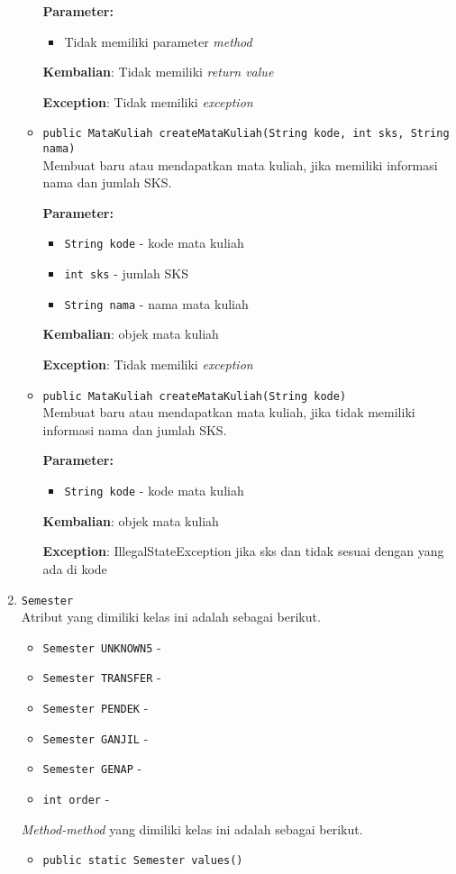 \documentclass{article}
\begin{document}
\begin{enumerate}
\begin{itemize}
\textbf{Parameter:}\begin{itemize}
\item Tidak memiliki parameter \textit{method}
\end{itemize}
\textbf{Kembalian}: Tidak memiliki \textit{return value}

\textbf{Exception}: Tidak memiliki \textit{exception}

\item \texttt{public MataKuliah createMataKuliah(String kode, int sks, String nama)}\\ 
Membuat baru atau mendapatkan mata kuliah, jika memiliki informasi
 nama dan jumlah SKS.

\textbf{Parameter:}
\begin{itemize}
\item \texttt{String kode} - 
kode mata kuliah
\item \texttt{int sks} - 
jumlah SKS
\item \texttt{String nama} - 
nama mata kuliah
\end{itemize}
\textbf{Kembalian}: objek mata kuliah

\textbf{Exception}: Tidak memiliki \textit{exception}

\item \texttt{public MataKuliah createMataKuliah(String kode)}\\ 
Membuat baru atau mendapatkan mata kuliah, jika tidak memiliki informasi
 nama dan jumlah SKS.

\textbf{Parameter:}
\begin{itemize}
\item \texttt{String kode} - 
kode mata kuliah
\end{itemize}
\textbf{Kembalian}: objek mata kuliah

\textbf{Exception}: IllegalStateException
             jika sks dan tidak sesuai dengan yang ada di kode

\end{itemize}
\item \texttt{Semester}\\ 
Atribut yang dimiliki kelas ini adalah sebagai berikut.
\begin{itemize}
\item \texttt{Semester UNKNOWN5} - 
\item \texttt{Semester TRANSFER} - 
\item \texttt{Semester PENDEK} - 
\item \texttt{Semester GANJIL} - 
\item \texttt{Semester GENAP} - 
\item \texttt{int order} - 
\end{itemize}
\textit{Method-method} yang dimiliki kelas ini adalah sebagai berikut.
\begin{itemize}
\item \texttt{public static Semester values()}\\ 



\end{itemize}
\end{enumerate}
\end{document}

